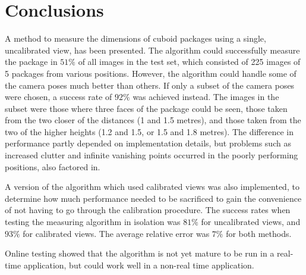 \section{Conclusions}
A method to measure the dimensions of cuboid packages using a single, uncalibrated view, has been presented.
The algorithm could successfully measure the package in $51\%$ of all images in the test set, which consisted of 225 images of 5 packages from various positions.
However, the algorithm could handle some of the camera poses much better than others.
If only a subset of the camera poses were chosen, a success rate of $92\%$ was achieved instead.
The images in the subset were those where three faces of the package could be seen, those taken from the two closer of the distances (1 and 1.5 metres), and those taken from the two of the higher heights (1.2 and 1.5, or 1.5 and 1.8 metres).
The difference in performance partly depended on implementation details, but problems such as increased clutter and infinite vanishing points occurred in the poorly performing positions, also factored in.

A version of the algorithm which used calibrated views was also implemented, to determine how much performance needed to be sacrificed to gain the convenience of not having to go through the calibration procedure.
The success rates when testing the measuring algorithm in isolation was $81\%$ for uncalibrated views, and $93\%$ for calibrated views.
The average relative error was $7\%$ for both methods.

Online testing showed that the algorithm is not yet mature to be run in a real-time application, but could work well in a non-real time application.





